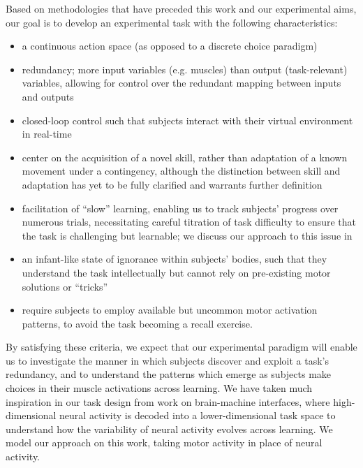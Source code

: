 \documentclass[../main.tex]{subfiles}
\begin{document}
Based on methodologies that have preceded this work and our experimental aims, our goal is to develop an experimental task with the following characteristics: 
%
\begin{itemize}
  \item a continuous action space (as opposed to a discrete choice paradigm)
  \item redundancy; more input variables (e.g. muscles) than output (task-relevant) variables, allowing for control over the redundant mapping between inputs and outputs
  \item closed-loop control such that subjects interact with their virtual environment in real-time
  \item center on the acquisition of a novel skill, rather than adaptation of a known movement under a contingency, although the distinction between skill and adaptation has yet to be fully clarified and warrants further definition
  \item facilitation of ``slow'' learning, enabling us to track subjects' progress over numerous trials, necessitating careful titration of task difficulty to ensure that the task is challenging but learnable; we discuss our approach to this issue in 
  \item an infant-like state of ignorance within subjects' bodies, such that they understand the task intellectually but cannot rely on pre-existing motor solutions or ``tricks''
  \item require subjects to employ available but uncommon motor activation patterns, to avoid the task becoming a recall exercise.
\end{itemize}
%
By satisfying these criteria, we expect that our experimental paradigm will enable us to investigate the manner in which subjects discover and exploit a task's redundancy, and to understand the patterns which emerge as subjects make choices in their muscle activations across learning. We have taken much inspiration in our task design from work on brain-machine interfaces\cite{golubLearningNeuralReassociation2018,hennigConstraintsNeuralRedundancy2018,hennigLearningShapedAbrupt2020b,normanSingletrialDecodingMovement2021,obyNewNeuralActivity2019,sadtlerNeuralConstraintsLearning2014b,staviskyMotorCorticalVisuomotor2017}, where high-dimensional neural activity is decoded into a lower-dimensional task space to understand how the variability of neural activity evolves across learning. We model our approach on this work, taking motor activity in place of neural activity.
\end{document}
